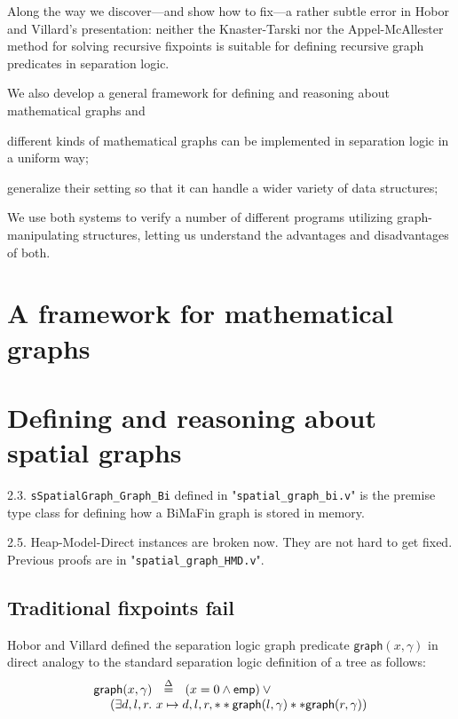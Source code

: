 \documentclass[pldi]{sigplanconf-pldi15}
\begin{document}
Along the way we discover---and show how to fix---a rather subtle error in Hobor and Villard's presentation: neither the
Knaster-Tarski \cite{tarski:fixpoint} nor the Appel-McAllester \cite{appel:fixpoint} method for solving recursive fixpoints is suitable for defining
recursive graph predicates in separation logic.

  We also develop a general framework for defining and reasoning about mathematical
graphs and

different kinds of mathematical
graphs can be implemented in separation logic in a uniform way;

generalize their setting
so that it can handle a wider variety of data structures;

We use both systems to verify a number of different programs utilizing graph-manipulating structures,
letting us understand the advantages and disadvantages of both.

\section{A framework for mathematical graphs}


\section{Defining and reasoning about spatial graphs}

2.3. \texttt{sSpatialGraph\_Graph\_Bi} defined in "\texttt{spatial\_graph\_bi.v}" is the premise type class for defining how a BiMaFin graph is stored in memory.

2.5. Heap-Model-Direct instances are broken now. They are not hard to get fixed. Previous proofs are in "\texttt{spatial\_graph\_HMD.v}".

\subsection{Traditional fixpoints fail}

Hobor and Villard defined the separation logic graph predicate $\mathsf{graph}(x,\gamma)$ in direct analogy to the standard
separation logic definition of a tree as follows:
\[
\begin{array}{l}
\mathsf{graph}(x,\gamma) ~~ \stackrel{\Delta}{=} ~~ ({x = 0} \wedge \mathsf{emp}) \vee \null \\
~~~~ (\exists d,l,r.~ x \mapsto d,l,r, ** \mathsf{graph}(l,\gamma) ** \mathsf{graph}(r,\gamma))
\end{array}
\]
\end{document}
